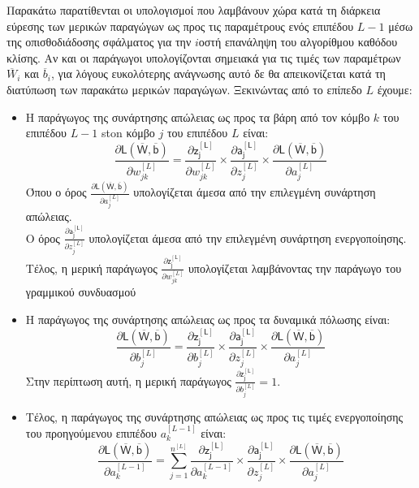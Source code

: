 Παρακάτω παρατίθενται οι υπολογισμοί που λαμβάνουν χώρα κατά τη διάρκεια εύρεσης των μερικών παραγώγων ως προς τις παραμέτρους ενός επιπέδου $L-1$ μέσω της οπισθοδιάδοσης σφάλματος για την $i$\textendash οστή επανάληψη του αλγορίθμου καθόδου κλίσης. Αν και οι παράγωγοι υπολογίζονται σημειακά για τις τιμές των παραμέτρων $\overline{W}_i$ και $\overline{b}_i$, για λόγους ευκολότερης ανάγνωσης αυτό δε θα απεικονίζεται κατά τη διατύπωση των παρακάτω μερικών παραγώγων. Ξεκινώντας από το επίπεδο $L$ έχουμε:
\begin{itemize}
  \item Η παράγωγος της συνάρτησης απώλειας ως προς τα βάρη από τον κόμβο $k$ του επιπέδου $L-1$ ston κόμβο $j$ του επιπέδου $L$ είναι:
  \begin{equation}\label{eq:dw}
    \frac{\partial \mathsf{L(\overline{W},\overline{b})}}{{\partial w^{[L]}_{jk}}} = 
    \frac{\partial \mathsf{z_j^{[L]}}}{{\partial w^{[L]}_{jk}}} \times
    \frac{\partial \mathsf{a_j^{[L]}}}{{\partial z_j^{[L]}}} \times
    \frac{\partial \mathsf{L(\overline{W},\overline{b})}}{{\partial a^{[L]}_{j}}}
  \end{equation}
  Όπου ο όρος $\frac{\partial \mathsf{L(\overline{W},\overline{b})}}{{\partial a^{[L]}_{j}}}$ υπολογίζεται άμεσα από την επιλεγμένη συνάρτηση απώλειας.\\ 
  Ο όρος $\frac{\partial \mathsf{a_j^{[L]}}}{{\partial z_j^{[L]}}}$ υπολογίζεται άμεσα από την επιλεγμένη συνάρτηση ενεργοποίησης.\\
  Τέλος, η μερική παράγωγος $\frac{\partial \mathsf{z_j^{[L]}}}{{\partial w^{[L]}_{jk}}}$ υπολογίζεται λαμβάνοντας την παράγωγο του γραμμικού συνδυασμού 
  \item Η παράγωγος της συνάρτησης απώλειας ως προς τα δυναμικά πόλωσης είναι:
  \begin{equation}\label{eq:db}
    \frac{\partial \mathsf{L(\overline{W},\overline{b})}}{{\partial b^{[L]}_{j}}} = 
    \frac{\partial \mathsf{z_j^{[L]}}}{{\partial b^{[L]}_{j}}} \times
    \frac{\partial \mathsf{a_j^{[L]}}}{{\partial z_j^{[L]}}} \times
    \frac{\partial \mathsf{L(\overline{W},\overline{b})}}{{\partial a^{[L]}_{j}}}
  \end{equation}
  Στην περίπτωση αυτή, η μερική παράγωγος $\frac{\partial \mathsf{z_j^{[L]}}}{{\partial b^{[L]}_{j}}} = 1$.
  \item Τέλος, η παράγωγος της συνάρτησης απώλειας ως προς τις τιμές ενεργοποίησης του προηγούμενου επιπέδου $a^{[L-1]}_{k}$ είναι:
  \begin{equation}\label{eq:da L-1}
    \frac{\partial \mathsf{L(\overline{W},\overline{b})}}{{\partial a^{[L-1]}_{k}}} = 
\sum_{j = 1}^{n^{[L]}}     \frac{\partial \mathsf{z_j^{[L]}}}{{\partial a^{[L-1]}_{k}}} \times
    \frac{\partial \mathsf{a_j^{[L]}}}{{\partial z_j^{[L]}}} \times
    \frac{\partial \mathsf{L(\overline{W},\overline{b})}}{{\partial a^{[L]}_{j}}} 
  \end{equation}

\end{itemize}
